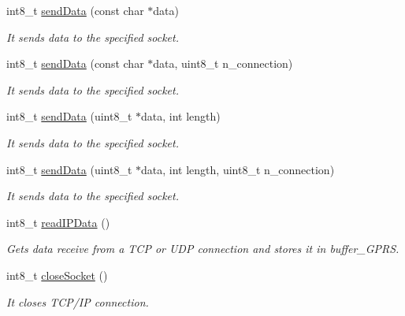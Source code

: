 \begin{DoxyCompactItemize}
int8\+\_\+t \hyperlink{class_wasp_g_p_r_s___pro__core_a0b5ba31b3407694e3c01f13aac35fed9}{send\+Data} (const char $\ast$data)
\begin{DoxyCompactList}\small\item\em It sends \textquotesingle{}data\textquotesingle{} to the specified \textquotesingle{}socket\textquotesingle{}. \end{DoxyCompactList}\item 
int8\+\_\+t \hyperlink{class_wasp_g_p_r_s___pro__core_ac3455ab553a10ee07a7ad3c7a186b0a2}{send\+Data} (const char $\ast$data, uint8\+\_\+t n\+\_\+connection)
\begin{DoxyCompactList}\small\item\em It sends \textquotesingle{}data\textquotesingle{} to the specified \textquotesingle{}socket\textquotesingle{}. \end{DoxyCompactList}\item 
int8\+\_\+t \hyperlink{class_wasp_g_p_r_s___pro__core_a2450936fb9295a548e729a076fd2ffed}{send\+Data} (uint8\+\_\+t $\ast$data, int length)
\begin{DoxyCompactList}\small\item\em It sends \textquotesingle{}data\textquotesingle{} to the specified \textquotesingle{}socket\textquotesingle{}. \end{DoxyCompactList}\item 
int8\+\_\+t \hyperlink{class_wasp_g_p_r_s___pro__core_a66cfe2f51d3291c6b878bca6071a4bae}{send\+Data} (uint8\+\_\+t $\ast$data, int length, uint8\+\_\+t n\+\_\+connection)
\begin{DoxyCompactList}\small\item\em It sends \textquotesingle{}data\textquotesingle{} to the specified \textquotesingle{}socket\textquotesingle{}. \end{DoxyCompactList}\item 
int8\+\_\+t \hyperlink{class_wasp_g_p_r_s___pro__core_aaf471aa07561e6483a4402286a4f5882}{read\+I\+P\+Data} ()
\begin{DoxyCompactList}\small\item\em Gets data receive from a T\+CP or U\+DP connection and stores it in \textquotesingle{}buffer\+\_\+\+G\+P\+RS\textquotesingle{}. \end{DoxyCompactList}\item 
int8\+\_\+t \hyperlink{class_wasp_g_p_r_s___pro__core_a3f94650f0e3219431dac477405ce9515}{close\+Socket} ()
\begin{DoxyCompactList}\small\item\em It closes T\+C\+P/\+IP connection. \end{DoxyCompactList}\item 

\end{DoxyCompactItemize}
